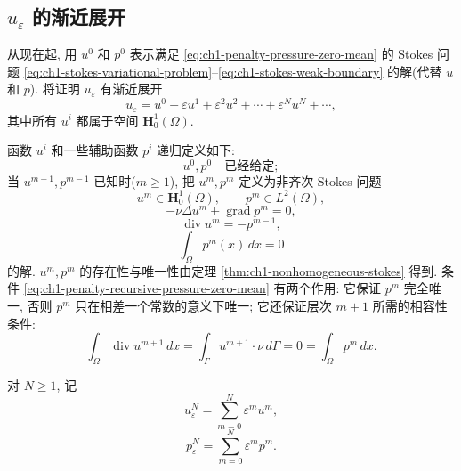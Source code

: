 \subsection{\texorpdfstring{$u_\varepsilon$}{u epsilon} 的渐近展开}
\label{subsec:ch1-penalty-asymptotic-expansion}

从现在起, 用 $u^0$ 和 $p^0$ 表示满足 \eqref{eq:ch1-penalty-pressure-zero-mean} 的 Stokes 问题 \eqref{eq:ch1-stokes-variational-problem}--\eqref{eq:ch1-stokes-weak-boundary} 的解(代替 $u$ 和 $p$). 将证明 $u_\varepsilon$ 有渐近展开
\begin{equation}
u_\varepsilon=u^0+\varepsilon u^1+\varepsilon^2u^2+\cdots
+\varepsilon^Nu^N+\cdots,
\label{eq:ch1-penalty-asymptotic-series}
\end{equation}
其中所有 $u^i$ 都属于空间 $\mathbf H_0^1(\Omega)$.

函数 $u^i$ 和一些辅助函数 $p^i$ 递归定义如下:
\begin{equation}
u^0,p^0\quad\text{已经给定};
\label{eq:ch1-penalty-base-pair}
\end{equation}
当 $u^{m-1},p^{m-1}$ 已知时($m\geq1$), 把 $u^m,p^m$ 定义为非齐次 Stokes 问题
\begin{equation}
u^m\in\mathbf H_0^1(\Omega),
\qquad p^m\in L^2(\Omega),
\label{eq:ch1-penalty-recursive-spaces}
\end{equation}
\begin{equation}
-\nu\Delta u^m+\operatorname{grad}p^m=0,
\label{eq:ch1-penalty-recursive-momentum}
\end{equation}
\begin{equation}
\operatorname{div}u^m=-p^{m-1},
\label{eq:ch1-penalty-recursive-divergence}
\end{equation}
\begin{equation}
\int_\Omega p^m(x)\,dx=0
\label{eq:ch1-penalty-recursive-pressure-zero-mean}
\end{equation}
的解. $u^m,p^m$ 的存在性与唯一性由定理 \ref{thm:ch1-nonhomogeneous-stokes} 得到. 条件 \eqref{eq:ch1-penalty-recursive-pressure-zero-mean} 有两个作用: 它保证 $p^m$ 完全唯一, 否则 $p^m$ 只在相差一个常数的意义下唯一; 它还保证层次 $m+1$ 所需的相容性条件:
\begin{equation}
\int_\Omega\operatorname{div}u^{m+1}\,dx
=\int_\Gamma u^{m+1}\cdot\nu\,d\Gamma
=0=\int_\Omega p^m\,dx.
\label{eq:ch1-penalty-recursive-compatibility}
\end{equation}

对 $N\geq1$, 记
\begin{equation}
u_\varepsilon^N=\sum_{m=0}^{N}\varepsilon^mu^m,
\label{eq:ch1-penalty-velocity-partial-sum}
\end{equation}
\begin{equation}
p_\varepsilon^N=\sum_{m=0}^{N}\varepsilon^mp^m.
\label{eq:ch1-penalty-pressure-partial-sum}
\end{equation}

